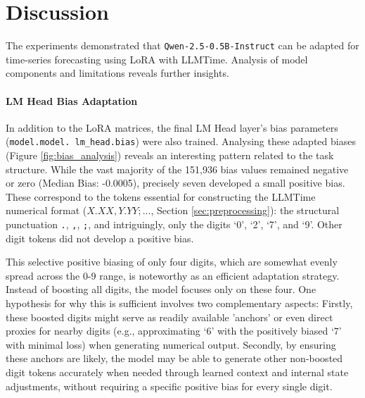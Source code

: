 \documentclass{article}
\begin{document}
\section{Discussion}
\label{sec:discussion}

The experiments demonstrated that \texttt{Qwen-2.5-0.5B-Instruct} can be adapted for time-series forecasting using LoRA with LLMTime. Analysis of model components and limitations reveals further insights.

\paragraph{LM Head Bias Adaptation}
In addition to the LoRA matrices, the final LM Head layer's bias parameters (\texttt{model.model. lm\_head.bias}) were also trained. Analysing these adapted biases (Figure \ref{fig:bias_analysis}) reveals an interesting pattern related to the task structure. While the vast majority of the 151,936 bias values remained negative or zero (Median Bias: -0.0005), precisely seven developed a small positive bias. These correspond to the tokens essential for constructing the LLMTime numerical format ($X.XX,Y.YY;...$, Section \ref{sec:preprocessing}): the structural punctuation \texttt{.}, \texttt{,}, \texttt{;}, and intriguingly, only the digits `0', `2', `7', and `9'. Other digit tokens did not develop a positive bias.


This selective positive biasing of only four digits, which are somewhat evenly spread across the 0-9 range, is noteworthy as an efficient adaptation strategy. Instead of boosting all digits, the model focuses only on these four. One hypothesis for why this is sufficient involves two complementary aspects: Firstly, these boosted digits might serve as readily available 'anchors' or even direct proxies for nearby digits (e.g., approximating `6' with the positively biased `7' with minimal loss) when generating numerical output. Secondly, by ensuring these anchors are likely, the model may be able to generate other non-boosted digit tokens accurately when needed through learned context and internal state adjustments, without requiring a specific positive bias for every single digit.
\end{document}
